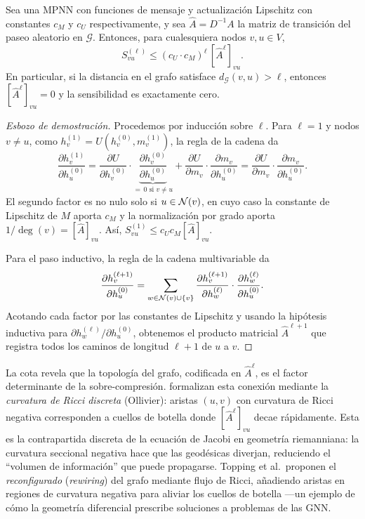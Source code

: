 \begin{proposition}
\label{prop:priors:oversquashing}
Sea una MPNN con funciones de mensaje y actualizaci\'on Lipschitz con constantes
$c_M$ y $c_U$ respectivamente, y sea $\hat A = D^{-1} A$ la matriz de transici\'on
del paseo aleatorio en $\mathcal{G}$. Entonces, para cualesquiera nodos
$v, u \in V$,
\[
  S_{vu}^{(\ell)} \le (c_U \cdot c_M)^\ell\, [\hat A^\ell]_{vu}.
\]
En particular, si la distancia en el grafo satisface
$d_{\mathcal{G}}(v, u) > \ell$, entonces $[\hat A^\ell]_{vu} = 0$ y la
sensibilidad es exactamente cero.
\end{proposition}

\begin{proof}[Esbozo de demostraci\'on]
Procedemos por inducci\'on sobre $\ell$. Para $\ell = 1$ y nodos $v \neq u$, como
$h_v^{(1)} = U(h_v^{(0)}, m_v^{(1)})$, la regla de la cadena da
\[
  \frac{\partial h_v^{(1)}}{\partial h_u^{(0)}}
    = \frac{\partial U}{\partial h_v^{(0)}}
      \cdot \underbrace{\frac{\partial h_v^{(0)}}{\partial h_u^{(0)}}}_{=\,0 \text{ si } v \neq u}
    + \frac{\partial U}{\partial m_v} \cdot \frac{\partial m_v}{\partial h_u^{(0)}}
    = \frac{\partial U}{\partial m_v} \cdot \frac{\partial m_v}{\partial h_u^{(0)}}.
\]
El segundo factor es no nulo solo si $u \in \mathcal{N}(v)$, en cuyo caso la constante de
Lipschitz de $M$ aporta $c_M$ y la normalizaci\'on por grado aporta
$1/\deg(v) = [\hat A]_{vu}$. As\'i, $S_{vu}^{(1)} \le c_U c_M [\hat A]_{vu}$.

Para el paso inductivo, la regla de la cadena multivariable da
\[
  \frac{\partial h_v^{(\ell+1)}}{\partial h_u^{(0)}}
    = \sum_{w \in \mathcal{N}(v) \cup \{v\}}
      \frac{\partial h_v^{(\ell+1)}}{\partial h_w^{(\ell)}}
      \cdot \frac{\partial h_w^{(\ell)}}{\partial h_u^{(0)}}.
\]
Acotando cada factor por las constantes de Lipschitz y usando la hip\'otesis
inductiva para $\partial h_w^{(\ell)} / \partial h_u^{(0)}$, obtenemos el producto
matricial $\hat A^{\ell+1}$ que registra todos los caminos de longitud $\ell + 1$
de $u$ a $v$. \qedhere
\end{proof}

\begin{remark}
\label{rem:priors:curvature}
La cota revela que la topolog\'ia del grafo, codificada en $\hat A^\ell$, es el
factor determinante de la sobre-compresi\'on. \citet{topping2022understanding}
formalizan esta conexi\'on mediante la \emph{curvatura de Ricci discreta}
(Ollivier): aristas $(u, v)$ con curvatura de Ricci negativa corresponden a
cuellos de botella donde $[\hat A^\ell]_{vu}$ decae r\'apidamente. Esta es la
contrapartida discreta de la ecuaci\'on de Jacobi en geometr\'ia riemanniana: la
curvatura seccional negativa hace que las geod\'esicas diverjan, reduciendo el
``volumen de informaci\'on'' que puede propagarse. Topping et al.\ proponen el
\emph{reconfigurado} (\emph{rewiring}) del grafo mediante flujo de Ricci,
a\~nadiendo aristas en regiones de curvatura negativa para aliviar los cuellos de
botella ---un ejemplo de c\'omo la geometr\'ia diferencial prescribe soluciones a
problemas de las GNN.
\end{remark}

